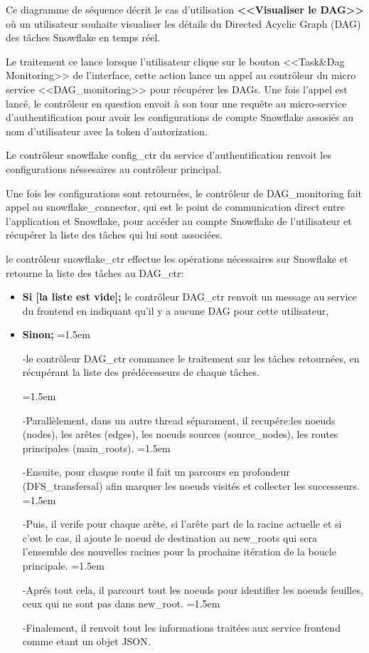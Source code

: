     \par Ce diagramme de séquence décrit le cas d'utilisation \textbf{<<Visualiser le DAG>>} où 
    un utilisateur souhaite visualiser les détails du Directed Acyclic Graph (DAG) des tâches Snowflake en temps réel.
    \par Le traitement ce lance lorsque l'utilisateur clique sur le bouton <<Task\&Dag Monitoring>> de l'interface, 
    cette action lance un appel au contrôleur du micro service <<DAG\_monitoring>> pour récupérer les DAGs.
    Une fois l'appel est lancé, le contrôleur en question envoit à son tour une requête au micro-service d'authentification pour avoir les configurations de compte Snowflake assosiés au nom d'utilisateur avec la token d'autorization.
    \par Le contrôleur snowflake config\_ctr du service d'authentification renvoit les configurations néssesaires au contrôleur principal.
    \par Une fois les configurations sont retournées, le contrôleur de DAG\_monitoring fait appel au snowflake\_connector, qui est le point de communication direct entre l'application et Snowflake, pour accéder au compte Snowflake de l'utilisateur et récupérer la liste des tâches qui lui sont associées.
    \par le contrôleur snowflake\_ctr effectue les opérations nécessaires sur Snowflake et retourne la liste des tâches au DAG\_ctr:
    \begin{itemize}
        \item \textbf{Si [la liste est vide];} le contrôleur DAG\_ctr renvoit un message au service du frontend en indiquant qu'il y a aucune DAG pour cette utilisateur,
        \item \textbf{Sinon;} \parindent=1.5em \par -le contrôleur DAG\_ctr commance le traitement sur les tâches retournées, en récupérant la liste des prédécesseurs de chaque tâches.
       
        \parindent=1.5em \par -Parallèlement, dans un autre thread séparament, il recupére:les noeuds (nodes), les arêtes (edges), les noeuds sources (source\_nodes), les routes principales (main\_roots). 
        \parindent=1.5em \par -Ensuite, pour chaque route il fait un parcours en profondeur (DFS\_transfersal) afin marquer les noeuds visités et collecter les successeurs. 
        \parindent=1.5em \par -Puis, il verife pour chaque arête, si l'arête part de la racine actuelle et si c'est le cas, il ajoute le noeud de destination au new\_roots qui sera l'ensemble des nouvelles racines pour la prochaine itération de la boucle principale.
        \parindent=1.5em \par -Aprés tout cela, il parcourt tout les noeuds pour identifier les noeuds feuilles, ceux qui ne sont pas dans new\_root.
        \parindent=1.5em \par -Finalement, il renvoit tout les informations traitées aux service frontend comme etant un objet JSON.
                
    \end{itemize}
